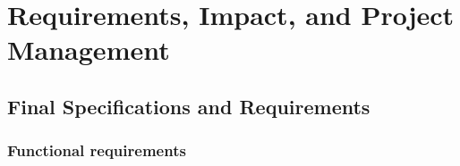 %

\chapter{Requirements, Impact, and Project Management}
\label{ch:requirements}


\section{Final Specifications and Requirements}
\label{sec:specifications}

\subsection{Functional requirements}
\label{sec:func-reqs}

